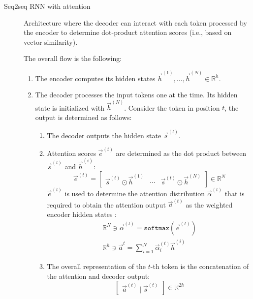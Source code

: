 \begin{description}
    \item[Seq2seq RNN with attention] 
        Architecture where the decoder can interact with each token processed by the encoder to determine dot-product attention scores (i.e., based on vector similarity).

        The overall flow is the following:
        \begin{enumerate}
            \item The encoder computes its hidden states $\vec{h}^{(1)}, \dots, \vec{h}^{(N)} \in \mathbb{R}^{h}$.
            \item The decoder processes the input tokens one at the time. Its hidden state is initialized with $\vec{h}^{(N)}$. Consider the token in position $t$, the output is determined as follows:
            \begin{enumerate}
                \item The decoder outputs the hidden state $\vec{s}^{(t)}$.
                \item Attention scores $\vec{e}^{(t)}$ are determined as the dot product between $\vec{s}^{(t)}$ and $\vec{h}^{(i)}$:
                \[ 
                    \vec{e}^{(t)} = 
                        \begin{bmatrix}
                            \vec{s}^{(t)} \odot \vec{h}^{(1)} & 
                            \cdots &
                            \vec{s}^{(t)} \odot \vec{h}^{(N)} 
                        \end{bmatrix} \in \mathbb{R}^{N} 
                \]
                $\vec{e}^{(t)}$ is used to determine the attention distribution $\vec{\alpha}^{(t)}$ that is required to obtain the attention output $\vec{a}^{(t)}$ as the weighted encoder hidden states :
                \[
                    \begin{gathered}
                        \mathbb{R}^{N} \ni \vec{\alpha}^{(t)} = \texttt{softmax}(\vec{e}^{(t)}) \\
                        \mathbb{R}^{h} \ni \vec{a}^{t} = \sum_{i=1}^{N} \vec{\alpha}^{(t)}_i \vec{h}^{(i)}
                    \end{gathered}
                \]
                \item The overall representation of the $t$-th token is the concatenation of the attention and decoder output:
                \[ \begin{bmatrix} \vec{a}^{(t)} \mid \vec{s}^{(t)} \end{bmatrix} \in \mathbb{R}^{2h} \]
            \end{enumerate}
        \end{enumerate}


\end{description}

